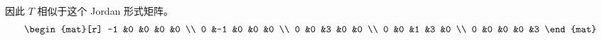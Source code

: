 \begin{example}
因此
\( T \) 相似于这个 Jordan 形式矩阵。
\begin{equation*}
   \begin{mat}[r]
     -1  &0  &0  &0  &0  \\
      0  &-1 &0  &0  &0  \\    
      0  &0  &3  &0  &0  \\
      0  &0  &1  &3  &0  \\
      0  &0  &0  &0  &3  
   \end{mat}
\end{equation*}
\end{example}





